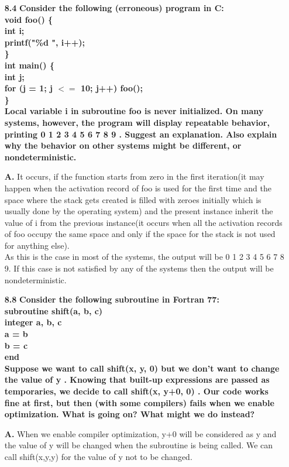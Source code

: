 \documentclass[letterpaper]{article}
\begin{document}
\begin{large}
\begin{flushleft}
\begin{enumerate}
\item[\textbf{8.4}]
\textbf{Consider the following (erroneous) program in C:\\
void foo() \{\\
int i;\\
printf("\%d ", i++);\\
\}\\
int main() \{\\
int j;\\
for (j = 1; j $<=$ 10; j++) foo();\\
\}\\
Local variable i in subroutine foo is never initialized. On many systems,
however, the program will display repeatable behavior, printing 0 1 2 3 4
5 6 7 8 9 . Suggest an explanation. Also explain why the behavior on other
systems might be different, or nondeterministic.}
\item[\textbf{A.}]
It occurs, if the function starts from zero in the first iteration(it may happen when the activation record of foo is used for the first time and the space where the stack gets created is filled with zeroes initially which is usually done by the operating system) and the present instance inherit the value of i from the previous instance(it occurs when all the activation records of foo occupy the same space and only if the space for the stack is not used for anything else).\\
As this is the case in most of the systems, the output will be 0 1 2 3 4 5 6 7 8 9. If this case is not satisfied by any of the systems then the output will be nondeterministic. 

\item[\textbf{8.8}]
\textbf{Consider the following subroutine in Fortran 77:\\
subroutine shift(a, b, c)\\
integer a, b, c\\
a = b\\
b = c\\
end\\
Suppose we want to call shift(x, y, 0) but we don’t want to change the
value of y . Knowing that built-up expressions are passed as temporaries,
we decide to call shift(x, y+0, 0) . Our code works fine at first, but then
(with some compilers) fails when we enable optimization. What is going on?
What might we do instead?}
\item[\textbf{A.}]
When we enable compiler optimization, y+0 will be considered as y and the value of y will be changed when the subroutine is being called. We can call shift(x,y,y) for the value of y not to be changed.


\end{enumerate}
\end{flushleft}
\end{large}
\end{document}
